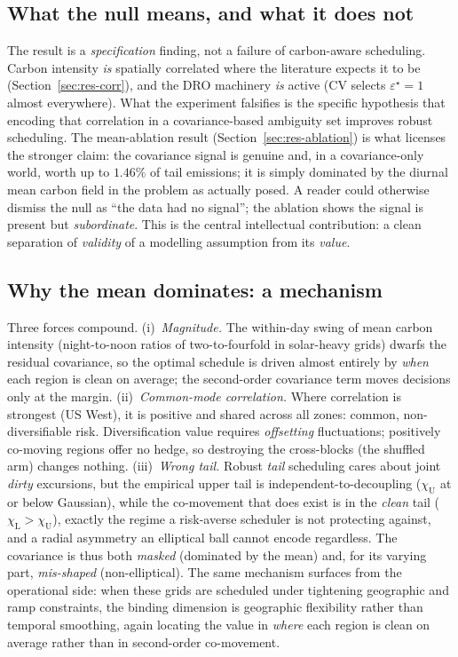 \documentclass[10pt,twocolumn]{article}
\newcommand{\chiU}{\chi_{\mathrm{U}}}
\newcommand{\chiL}{\chi_{\mathrm{L}}}
\begin{document}
\subsection{What the null means, and what it does not}
The result is a \emph{specification} finding, not a failure of carbon-aware
scheduling. Carbon intensity \emph{is} spatially correlated where the literature
expects it to be (Section~\ref{sec:res-corr}), and the DRO machinery \emph{is}
active (CV selects $\varepsilon^\star=1$ almost everywhere). What the experiment
falsifies is the specific hypothesis that encoding that correlation in a
covariance-based ambiguity set improves robust scheduling. The mean-ablation
result (Section~\ref{sec:res-ablation}) is what licenses the stronger claim: the
covariance signal is genuine and, in a covariance-only world, worth up to
$1.46\%$ of tail emissions; it is simply dominated by the diurnal mean carbon
field in the problem as actually posed. A reader could otherwise dismiss the null
as ``the data had no signal''; the ablation shows the signal is present but
\emph{subordinate}. This is the central intellectual contribution: a clean
separation of \emph{validity} of a modelling assumption from its \emph{value}.

\subsection{Why the mean dominates: a mechanism}\label{sec:res-mech}
Three forces compound. (i)~\emph{Magnitude.} The within-day swing of mean carbon
intensity (night-to-noon ratios of two-to-fourfold in solar-heavy grids) dwarfs
the residual covariance, so the optimal schedule is driven almost entirely by
\emph{when} each region is clean on average; the second-order covariance term
moves decisions only at the margin. (ii)~\emph{Common-mode correlation.} Where
correlation is strongest (US West), it is positive and shared across all zones:
common, non-diversifiable risk. Diversification value requires \emph{offsetting}
fluctuations; positively co-moving regions offer no hedge, so destroying the
cross-blocks (the shuffled arm) changes nothing. (iii)~\emph{Wrong tail.} Robust
\emph{tail} scheduling cares about joint \emph{dirty} excursions, but the empirical
upper tail is independent-to-decoupling ($\chiU$ at or below Gaussian), while the
co-movement that does exist is in the \emph{clean} tail ($\chiL>\chiU$), exactly
the regime a risk-averse scheduler is not protecting against, and a radial
asymmetry an elliptical ball cannot encode regardless. The covariance is thus both
\emph{masked} (dominated by the mean) and, for its varying part, \emph{mis-shaped}
(non-elliptical). The same mechanism surfaces from the operational side: when these
grids are scheduled under tightening geographic and ramp constraints, the binding
dimension is geographic flexibility rather than temporal smoothing, again locating
the value in \emph{where} each region is clean on average rather than in second-order
co-movement.
\end{document}
